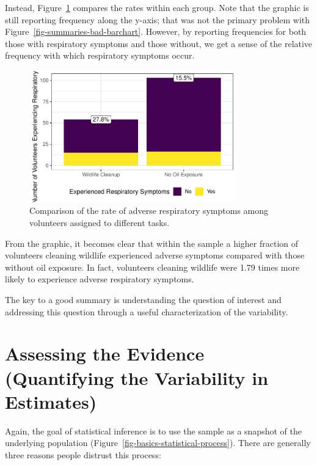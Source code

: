 \documentclass[
  letterpaper,
  DIV=11,
  numbers=noendperiod]{scrreprt}
\theoremstyle{plain}
\theoremstyle{definition}
\theoremstyle{definition}
\theoremstyle{remark}
\begin{document}
Instead, Figure~\ref{fig-summaries-good-barchart} compares the rates
within each group. Note that the graphic is still reporting frequency
along the y-axis; that was not the primary problem with
Figure~\ref{fig-summaries-bad-barchart}. However, by reporting
frequencies for both those with respiratory symptoms and those without,
we get a sense of the relative frequency with which respiratory symptoms
occur.

\begin{figure}

{\centering \includegraphics[width=0.8\textwidth,height=\textheight]{./images/fig-summaries-good-barchart-1.pdf}

}

\caption{\label{fig-summaries-good-barchart}Comparison of the rate of
adverse respiratory symptoms among volunteers assigned to different
tasks.}

\end{figure}

From the graphic, it becomes clear that within the sample a higher
fraction of volunteers cleaning wildlife experienced adverse symptoms
compared with those without oil exposure. In fact, volunteers cleaning
wildlife were 1.79 times more likely to experience adverse respiratory
symptoms.

The key to a good summary is understanding the question of interest and
addressing this question through a useful characterization of the
variability.

\hypertarget{sec-samplingdistns}{%
\chapter{Assessing the Evidence (Quantifying the Variability in
Estimates)}\label{sec-samplingdistns}}

Again, the goal of statistical inference is to use the sample as a
snapshot of the underlying population
(Figure~\ref{fig-basics-statistical-process}). There are generally three
reasons people distrust this process:
\end{document}

